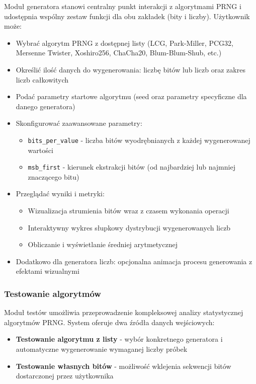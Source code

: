 \documentclass[12pt,a4paper]{article}
\begin{document}
Moduł generatora stanowi centralny punkt interakcji z algorytmami PRNG i udostępnia wspólny zestaw funkcji dla obu zakładek (bity i liczby). Użytkownik może:
\begin{itemize}
    \item Wybrać algorytm PRNG z dostępnej listy (LCG, Park-Miller, PCG32, Mersenne Twister, Xoshiro256, ChaCha20, Blum-Blum-Shub, etc.)
    \item Określić ilość danych do wygenerowania: liczbę bitów lub liczb oraz zakres liczb całkowitych
    \item Podać parametry startowe algorytmu (seed oraz parametry specyficzne dla danego generatora)
    \item Skonfigurować zaawansowane parametry:
    \begin{itemize}
        \item \texttt{bits\_per\_value} - liczba bitów wyodrębnianych z każdej wygenerowanej wartości
        \item \texttt{msb\_first} - kierunek ekstrakcji bitów (od najbardziej lub najmniej znaczącego bitu)
    \end{itemize}
    \item Przeglądać wyniki i metryki:
    \begin{itemize}
        \item Wizualizacja strumienia bitów wraz z czasem wykonania operacji
        \item Interaktywny wykres słupkowy dystrybucji wygenerowanych liczb
        \item Obliczanie i wyświetlanie średniej arytmetycznej
    \end{itemize}
    \item Dodatkowo dla generatora liczb: opcjonalna animacja procesu generowania z efektami wizualnymi
\end{itemize}

\subsubsection{Testowanie algorytmów}

Moduł testów umożliwia przeprowadzenie kompleksowej analizy statystycznej algorytmów PRNG. System oferuje dwa źródła danych wejściowych:

\begin{itemize}
    \item \textbf{Testowanie algorytmu z listy} - wybór konkretnego generatora i automatyczne wygenerowanie wymaganej liczby próbek
    \item \textbf{Testowanie własnych bitów} - możliwość wklejenia sekwencji bitów dostarczonej przez użytkownika
\end{itemize}
\end{document}
